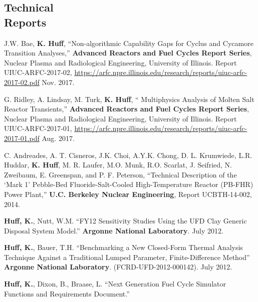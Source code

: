\documentclass[margin,line]{resume}
\begin{document}
\begin{resume}
    \section{\mysidestyle Technical\\Reports}
    \begin{bibenum}
      \item J.W. Bae, \textbf{K. Huff}, ``Non-algorithmic Capability Gaps for 
              Cyclus and Cycamore Transition Analyses,'' \textbf{Advanced 
              Reactors and Fuel Cycles Report Series}, Nuclear Plasma and 
              Radiological Engineering, University of Illinois.  Report 
              UIUC-ARFC-2017-02, 
              \url{https://arfc.npre.illinois.edu/research/reports/uiuc-arfc-2017-02.pdf} 
              Nov. 2017.  
      \item G. Ridley, A. Lindsay, M. Turk, \textbf{K. Huff}, ``
              Multiphysics Analysis of Molten Salt Reactor Transients,'' \textbf{Advanced 
              Reactors and Fuel Cycles Report Series}, Nuclear Plasma and 
              Radiological Engineering, University of Illinois.  Report 
              UIUC-ARFC-2017-01, 
              \url{https://arfc.npre.illinois.edu/research/reports/uiuc-arfc-2017-01.pdf} 
              Aug. 2017.  
      \item C. Andreades, A. T. Cisneros, J.K. Choi, A.Y.K. Chong, D. L.  
              Krumwiede, L.R. Huddar, \textbf{K. Huff}, M. R. Laufer, M.O. 
              Munk, R.O.  Scarlat, J. Seifried, N. Zweibaum, E. Greenspan, and 
              P. F. Peterson, ``Technical Description of the ‘Mark 1’ 
              Pebble-Bed Fluoride-Salt-Cooled High-Temperature Reactor (PB-FHR) 
              Power Plant,'' \textbf{U.C. Berkeley Nuclear Engineering}, Report 
              UCBTH-14-002, 2014.
      \item \textbf{Huff, K.}, Nutt, W.M. ``FY12 Sensitivity Studies Using the UFD Clay Generic Disposal System Model.''
        \textbf{Argonne National Laboratory}. July 2012.
      \item \textbf{Huff, K.}, Bauer, T.H. ``Benchmarking a New Closed-Form Thermal Analysis Technique Against a Traditional
        Lumped Parameter, Finite-Difference Method'' \textbf{Argonne National Laboratory}. (FCRD-UFD-2012-000142). July 2012.
      \item \textbf{Huff, K.}, Dixon, B., Braase, L. ``Next Generation Fuel Cycle Simulator Functions and Requirements Document.''

\end{bibenum}
\end{resume}
\end{document}

